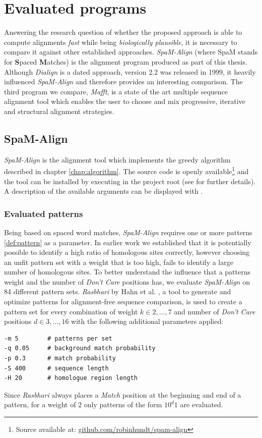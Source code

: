 \section{Evaluated programs}

Answering the research question of whether the proposed approach is able to compute alignments \textit{fast} while being \textit{biologically plausible}, it is necessary to compare it against other established approaches. \textit{SpaM-Align} (where SpaM stands for \textbf{S}paced \textbf{M}atches) is the alignment program produced as part of this thesis. Although \textit{Dialign} is a dated approach, version 2.2 was released in 1999, it heavily influenced \textit{SpaM-Align} and therefore provides an interesting comparison.
The third program we compare, \textit{Mafft}, is a state of the art multiple sequence alignment tool which enables the user to choose and mix progressive, iterative and structural alignment strategies.

\subsection{SpaM-Align}
\textit{SpaM-Align} is the alignment tool which implements the greedy algorithm described in chapter \ref{chap:algorithm}. The source code is openly available\footnote{Source available at: \href{https://github.com/robinhundt/spam-align}{github.com/robinhundt/spam-align}} and the tool can be installed by executing  in the project root (see  for further details). A description of the available arguments can be displayed with .

\subsubsection{Evaluated patterns}
Being based on spaced word matches, \textit{SpaM-Align} requires one or more patterns \ref{def:pattern} as a parameter. In earlier work we established that it is potentially possible to identify a high ratio of homologous sites correctly, however choosing an unfit pattern set with a weight that is too high, fails to identify a large number of homologous sites. To better understand the influence that a patterns weight and the number of \textit{Don't Care} positions has, we evaluate \textit{SpaM-Align} on 84 different pattern sets. \textit{Rasbhari} by Hahn et al. \cite{hahn2016rasbhari}, a tool to generate and optimize patterns for alignment-free sequence comparison, is used to create a pattern set for every combination of weight $k \in {2, ..., 7}$ and number of \textit{Don't Care} positions $d \in {3, ..., 16}$ with the following additional parameters applied:
\begin{verbatim}
-m 5        # patterns per set
-q 0.05     # background match probability
-p 0.3      # match probability
-S 400      # sequence length
-H 20       # homologue region length
\end{verbatim}
Since \textit{Rasbhari} always places a \textit{Match} position at the beginning and end of a pattern, for a weight of 2 only patterns of the form $10^d1$ are evaluated.

